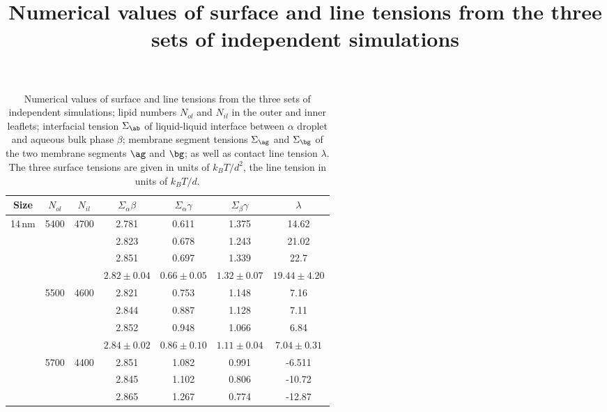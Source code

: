 \documentclass{article}
\title{Numerical  values of surface and line tensions from the three sets of independent simulations}
\begin{document}
\maketitle

\begin{table}
    \centering
    \caption{Numerical  values of surface and line tensions from the three sets of independent simulations; 
    lipid numbers $N_{ol}$ and $N_{il}$ in the outer and inner leaflets;  interfacial tension $\Sigma_\ab$ of liquid-liquid interface between $\alpha$ droplet and aqueous bulk phase $\beta$; membrane segment tensions $\Sigma_\ag$ and $\Sigma_\bg$ of 
    the two membrane segments $\ag$ and $\bg$;  as well as contact line tension 
    $\lambda$. The three surface tensions are given in units of $k_B T/d^2$, the line tension in units of $k_B T/d$.}
    \begin{tabular}{|c|c|c|c|c|c|c|}
    \hline
     Size  & $N_{ol}$ & $N_{il}$   & $\Sigma_\alpha\beta$ & $\Sigma_\alpha\gamma$ &$\Sigma_\beta\gamma$ & $\lambda$ \\
    \hline
     14\,nm & 5400 & 4700        & 2.781        & 0.611        & 1.375       & 14.62 \\
              &      &             & 2.823        & 0.678        & 1.243       & 21.02 \\
              &      &             & 2.851        & 0.697        & 1.339       & 22.7  \\
     \hline  
              &      &             & $2.82 \pm 0.04$ & $0.66 \pm 0.05$ & $1.32 \pm 0.07$ & $19.44 \pm 4.20$ \\
     \hline
              & 5500 & 4600        & 2.821        & 0.753        & 1.148       & 7.16 \\
              &      &             & 2.844        & 0.887        & 1.128       & 7.11 \\
              &      &             & 2.852        & 0.948        & 1.066       & 6.84 \\
     \hline
              &      &             & $2.84 \pm 0.02$ & $0.86 \pm 0.10$ & $1.11 \pm 0.04$ & $7.04  \pm 0.31$ \\
     \hline
              & 5700 & 4400        & 2.851        & 1.082        & 0.991       & -6.511 \\
              &      &             & 2.845        & 1.102        & 0.806       & -10.72 \\
              &      &             & 2.865        & 1.267        & 0.774       & -12.87 \\

\end{tabular}
\end{table}
\end{document}
